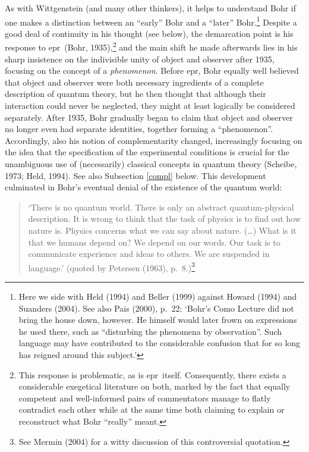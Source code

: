 \documentclass[12pt]{article}
\newcommand{\epr}{{\sc epr}}
\begin{document}
As with Wittgenstein (and many other thinkers), it helps to understand Bohr if one makes a distinction between an ``early'' Bohr and a ``later'' Bohr.\footnote{Here we side with Held (1994) and Beller (1999) against Howard (1994) and Suanders (2004). See also Pais (2000), p.\ 22: `Bohr's Como Lecture did not bring the house down, however. He himself would later frown on expressions he used there, such as ``disturbing the phenomena by observation''. Such language may have contributed to the considerable confusion that for so long has reigned around this subject.'\label{paisnote}}  Despite a good deal of continuity in his thought (see below), the demarcation point is his response  to \epr\  (Bohr, 1935),\footnote{This response is problematic, as is \epr\  itself. Consequently, there exists a considerable exegetical literature on both, marked by the fact that equally competent and well-informed pairs of commentators manage to flatly contradict each other while at the same time both claiming to explain or reconstruct what Bohr ``really'' meant. }  and the main shift he  made afterwards lies in his sharp insistence on the indivisible unity of object and observer after 1935, focusing on the concept of a {\it phenomenon}.
  Before \epr, Bohr equally well believed that object and observer were both necessary ingredients of a complete description of quantum theory, but he then thought that although their interaction could never be neglected,  they might at least logically be considered separately. After 1935, Bohr gradually began to claim that object and observer no longer even had  separate identities, together forming a ``phenomenon''. Accordingly, also his notion of complementarity changed, increasingly focusing on the idea that the specification of the experimental conditions is crucial for the unambiguous use of (necessarily) classical concepts in quantum theory (Scheibe, 1973; Held, 1994). See also Subsection \ref{compl} below. 
This development culminated in Bohr's eventual denial of the existence of the quantum world: 
\begin{quote}
`There is no quantum world. There is only an abstract quantum-physical description. It is wrong to think that the task of physics is to find out how nature is. Physics concerns what we can say about nature. (\ldots) What is it that we humans depend on? We depend on our words. Our task is to communicate experience and ideas to others. We are suspended in language.' (quoted by Petersen (1963), p.\ 8.)\footnote{See Mermin (2004) 
for a witty discussion of this controversial  quotation.}  \end{quote}
\end{document}
